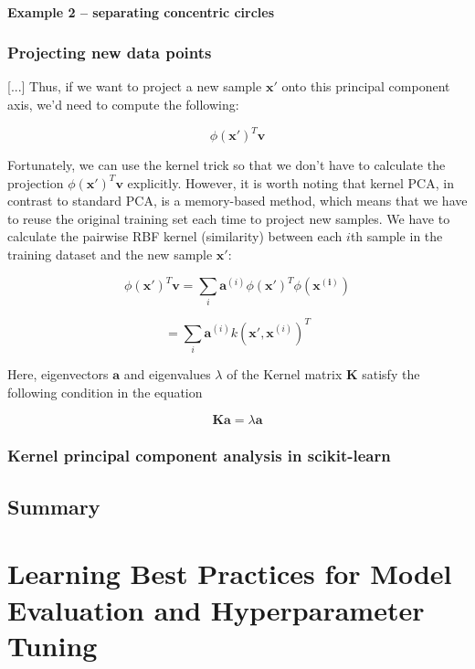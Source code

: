 \documentclass[letterpaper]{report}
\begin{document}
\subsubsection{Example 2 -- separating concentric circles}
\subsection{Projecting new data points}

[...] Thus, if we want to project a new sample $\mathbf{x}'$ onto this principal component axis, we'd need to compute the following: 

\[
\phi(\mathbf{x}')^T \mathbf{v}
\]

Fortunately, we can use the kernel trick so that we don't have to calculate the projection $\phi(\mathbf{x}')^T \mathbf{v}$ explicitly. However, it is worth noting that kernel PCA, in contrast to standard PCA, is a memory-based method, which means that we have to reuse the original training set each time to project new samples. We have to calculate the pairwise RBF kernel (similarity) between each $i$th sample in the training dataset and the new sample $\mathbf{x}'$:

\[
\phi(\mathbf{x'})^T \mathbf{v} = \sum_i \mathbf{a}^{(i)} \phi(\mathbf{x'})^T \phi (\mathbf{x^{(i)}})
\]

\[
= \sum_i \mathbf{a}^{(i)} k (\mathbf{x'}, \mathbf{x}^{(i)})^T
\]

Here, eigenvectors $\mathbf{a}$ and eigenvalues $\lambda$ of the Kernel matrix $\mathbf{K}$ satisfy the following condition in the equation

\[
\mathbf{Ka} = \lambda \mathbf{a}
\]



\subsection{Kernel principal component analysis in scikit-learn}
\section{Summary}




\chapter{Learning Best Practices for Model Evaluation and Hyperparameter Tuning}
\end{document}
